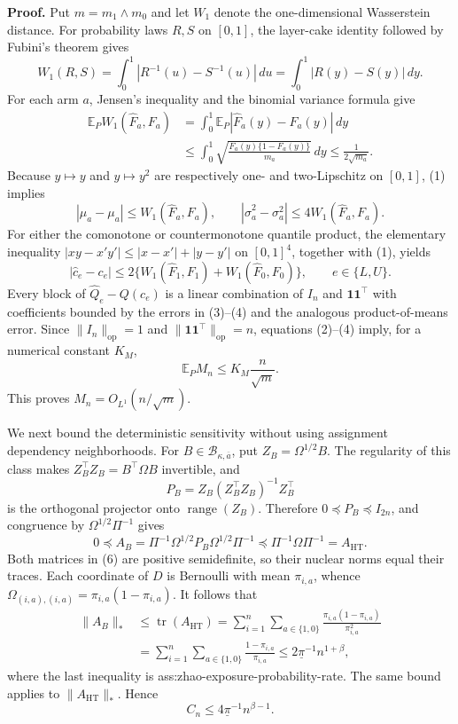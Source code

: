 \textbf{Proof.}
Put \(m=m_1\wedge m_0\) and let \(W_1\) denote the one-dimensional Wasserstein distance.  For probability laws \(R,S\) on \([0,1]\), the layer-cake identity followed by Fubini's theorem gives
\[
W_1(R,S)
=\int_0^1|R^{-1}(u)-S^{-1}(u)|\,du
=\int_0^1|R(y)-S(y)|\,dy.
\tag{1}
\]
For each arm \(a\), Jensen's inequality and the binomial variance formula give
\[
\begin{aligned}
\mathbb E_PW_1(\widehat F_a,F_a)
&=\int_0^1\mathbb E_P|\widehat F_a(y)-F_a(y)|\,dy\\
&\le\int_0^1\sqrt{\frac{F_a(y)\{1-F_a(y)\}}{m_a}}\,dy
\le\frac{1}{2\sqrt{m_a}}.
\end{aligned}
\tag{2}
\]
Because \(y\mapsto y\) and \(y\mapsto y^2\) are respectively one- and two-Lipschitz on \([0,1]\), (1) implies
\[
|\widehat\mu_a-\mu_a|\le W_1(\widehat F_a,F_a),
\qquad
|\widehat\sigma_a^2-\sigma_a^2|
\le4W_1(\widehat F_a,F_a).
\tag{3}
\]
For either the comonotone or countermonotone quantile product, the elementary inequality \(|xy-x'y'|\le|x-x'|+|y-y'|\) on \([0,1]^4\), together with (1), yields
\[
|\widehat c_e-c_e|
\le2\{W_1(\widehat F_1,F_1)+W_1(\widehat F_0,F_0)\},
\qquad e\in\{L,U\}.
\tag{4}
\]
Every block of \(\widehat Q_e-Q(c_e)\) is a linear combination of \(I_n\) and \(\mathbf1\mathbf1^\top\) with coefficients bounded by the errors in (3)--(4) and the analogous product-of-means error.  Since \(\lVert I_n\rVert_{\mathrm{op}}=1\) and \(\lVert\mathbf1\mathbf1^\top\rVert_{\mathrm{op}}=n\), equations (2)--(4) imply, for a numerical constant \(K_M\),
\[
\mathbb E_PM_n
\le K_M\frac{n}{\sqrt m}.
\tag{5}
\]
This proves \(M_n=O_{L^1}(n/\sqrt m)\).

We next bound the deterministic sensitivity without using assignment dependency neighborhoods.  For \(B\in\mathcal B_{\kappa,\overline a}\), put \(Z_B=\Omega^{1/2}B\).  The regularity of this class makes \(Z_B^\top Z_B=B^\top\Omega B\) invertible, and
\[
P_B=Z_B(Z_B^\top Z_B)^{-1}Z_B^\top
\]
is the orthogonal projector onto \(\operatorname{range}(Z_B)\).  Therefore \(0\preceq P_B\preceq I_{2n}\), and congruence by \(\Omega^{1/2}\Pi^{-1}\) gives
\[
0\preceq
A_B=\Pi^{-1}\Omega^{1/2}P_B\Omega^{1/2}\Pi^{-1}
\preceq
\Pi^{-1}\Omega\Pi^{-1}=A_{\mathrm{HT}}.
\tag{6}
\]
Both matrices in (6) are positive semidefinite, so their nuclear norms equal their traces.  Each coordinate of \(D\) is Bernoulli with mean \(\pi_{i,a}\), whence \(\Omega_{(i,a),(i,a)}=\pi_{i,a}(1-\pi_{i,a})\).  It follows that
\[
\begin{aligned}
\lVert A_B\rVert_*
&\le\operatorname{tr}(A_{\mathrm{HT}})
=\sum_{i=1}^n\sum_{a\in\{1,0\}}
\frac{\pi_{i,a}(1-\pi_{i,a})}{\pi_{i,a}^2}\\
&=\sum_{i=1}^n\sum_{a\in\{1,0\}}
\frac{1-\pi_{i,a}}{\pi_{i,a}}
\le2\underline\pi^{-1}n^{1+\beta},
\end{aligned}
\tag{7}
\]
where the last inequality is ass:zhao-exposure-probability-rate.  The same bound applies to \(\lVert A_{\mathrm{HT}}\rVert_*\).  Hence
\[
C_n\le4\underline\pi^{-1}n^{\beta-1}.
\tag{8}
\]


